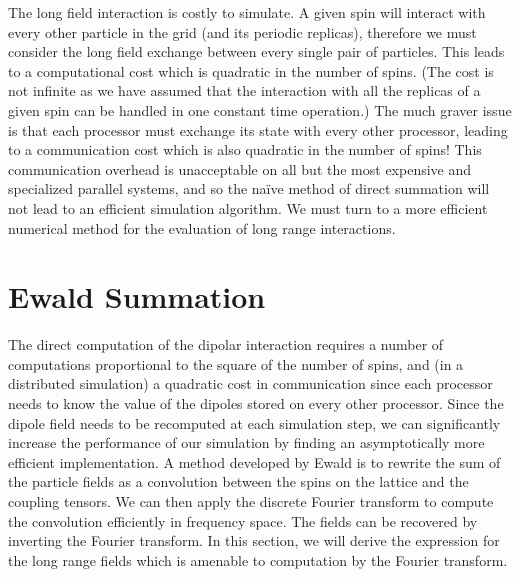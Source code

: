 \documentclass{article}
\theoremstyle{definition}
\begin{document}
The long field interaction is costly to simulate. A given spin will interact
with every other particle in the grid (and its periodic replicas), therefore we
must consider the long field exchange between every single pair of particles.
This leads to a computational cost which is quadratic in the number of spins.
(The cost is not infinite as we have assumed that the interaction with all the
replicas of a given spin can be handled in one constant time operation.) The
much graver issue is that each processor must exchange its state with every
other processor, leading to a communication cost which is also quadratic in the
number of spins! This communication overhead is unacceptable on all but the most
expensive and specialized parallel systems, and so the naïve method of direct
summation will not lead to an efficient simulation algorithm. We must turn to a
more efficient numerical method for the evaluation of long range interactions.

\section{Ewald Summation}
The direct computation of the dipolar interaction requires a number of
computations proportional to the square of the number of spins, and (in a
distributed simulation) a quadratic cost in communication since each processor
needs to know the value of the dipoles stored on every other processor. Since
the dipole field needs to be recomputed at each simulation step, we can
significantly increase the performance of our simulation by finding an
asymptotically more efficient implementation. A method developed by Ewald is to
rewrite the sum of the particle fields as a convolution between the spins on the
lattice and the coupling tensors\cite{kittleSSP}. We can then apply the discrete
Fourier transform to compute the convolution efficiently in frequency space. The
fields can be recovered by inverting the Fourier transform. In this section, we
will derive the expression for the long range fields which is amenable to
computation by the Fourier transform.
\end{document}

